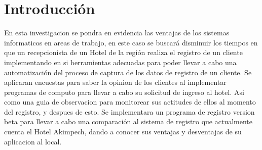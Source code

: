 \documentclass[a4paper,10pt]{report}
\newcommand{\vacio}{\textcolor{white}{hola}}
\begin{document}
{%

\newpage

\renewcommand{\headrulewidth}{0.5pt}
\fancyhead[L]{\vacio}

\renewcommand{\footrulewidth}{0.5pt}
\fancyfoot[C]{\vacio}






\newpage


\tableofcontents

\newpage



\section{\textbf{Introducción}}

En esta investigacion se pondra en evidencia las ventajas de los sistemas informaticos en
areas de trabajo, en este caso se buscará disminuir los tiempos en que un recepcionista de un 
Hotel de la región realiza el registro de un cliente implementando en si herramientas adecuadas para poder llevar a cabo una automatización del proceso de captura de los datos de registro de un cliente.
Se aplicaran encuestas para saber la opinion de los clientes al implementar programas de computo para llevar a cabo su solicitud de ingreso al hotel.
Asi como una guia de observacion para monitorear sus actitudes de ellos al momento del registro, y despues de esto.
Se implementara un programa de registro version beta para llevar a cabo una comparación al sistema de registro que actualmente cuenta el Hotel Akimpech, dando a conocer sus ventajas y desventajas de su aplicacion al local.
%

}
\

\
\end{document}
